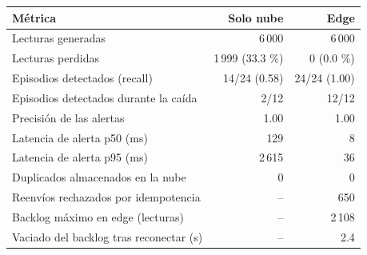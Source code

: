 \begin{tabularx}{\textwidth}{@{}Lrr@{}}
\toprule
\textbf{Métrica} & \textbf{Solo nube} & \textbf{Edge} \\
\midrule
Lecturas generadas & 6\,000 & 6\,000 \\
Lecturas perdidas & 1\,999 (33.3 \%) & 0 (0.0 \%) \\
Episodios detectados (recall) & 14/24 (0.58) & 24/24 (1.00) \\
Episodios detectados durante la caída & 2/12 & 12/12 \\
Precisión de las alertas & 1.00 & 1.00 \\
Latencia de alerta p50 (ms) & 129 & 8 \\
Latencia de alerta p95 (ms) & 2\,615 & 36 \\
Duplicados almacenados en la nube & 0 & 0 \\
Reenvíos rechazados por idempotencia & -- & 650 \\
Backlog máximo en edge (lecturas) & -- & 2\,108 \\
Vaciado del backlog tras reconectar (s) & -- & 2.4 \\
\bottomrule
\end{tabularx}
